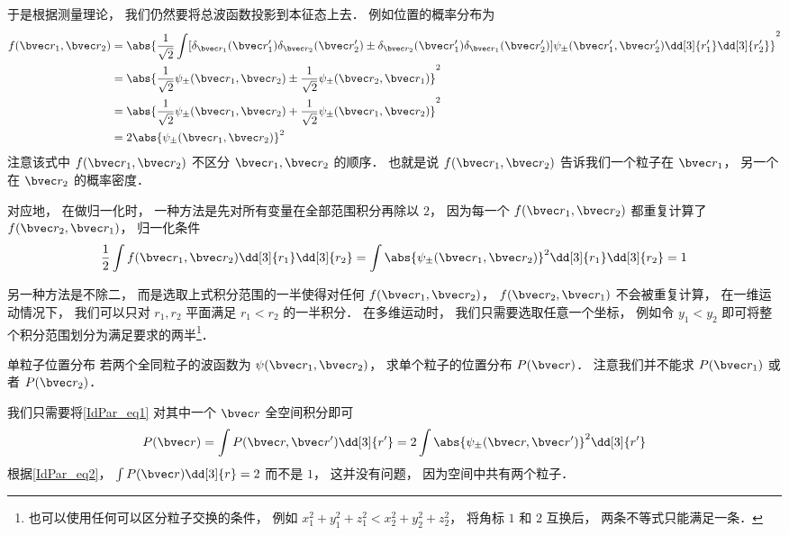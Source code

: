 于是根据测量理论， 我们仍然要将总波函数投影到本征态上去． 例如位置的概率分布为
\begin{equation}\label{IdPar_eq1}
\begin{aligned}
f(\bvec r_1, \bvec r_2) &= \abs{\frac{1}{\sqrt{2}}\int [\delta_{\bvec r_1}(\bvec r'_1) \delta_{\bvec r_2}(\bvec r'_2) \pm \delta_{\bvec r_2}(\bvec r'_1) \delta_{\bvec r_1}(\bvec r'_2)] \psi_\pm(\bvec r'_1,\bvec r'_2) \dd[3]{r'_1}\dd[3]{r'_2}}^2\\
&= \abs{\frac{1}{\sqrt{2}} \psi_\pm(\bvec r_1, \bvec r_2) \pm  \frac{1}{\sqrt{2}} \psi_\pm(\bvec r_2, \bvec r_1)}^2\\
&= \abs{\frac{1}{\sqrt{2}} \psi_\pm(\bvec r_1, \bvec r_2) +  \frac{1}{\sqrt{2}} \psi_\pm(\bvec r_1, \bvec r_2)}^2\\
&= 2\abs{\psi_\pm(\bvec r_1, \bvec r_2)}^2
\end{aligned}
\end{equation}
注意该式中 $f(\bvec r_1, \bvec r_2)$ 不区分 $\bvec r_1, \bvec r_2$ 的顺序． 也就是说 $f(\bvec r_1, \bvec r_2)$ 告诉我们一个粒子在 $\bvec r_1$， 另一个在 $\bvec r_2$ 的概率密度．

对应地， 在做归一化时， 一种方法是先对所有变量在全部范围积分再除以 $2$， 因为每一个 $f(\bvec r_1, \bvec r_2)$ 都重复计算了 $f(\bvec r_2, \bvec r_1)$， 归一化条件
\begin{equation}\label{IdPar_eq2}
\frac{1}{2}\int f(\bvec r_1, \bvec r_2) \dd[3]{r_1}\dd[3]{r_2} = \int \abs{\psi_\pm(\bvec r_1, \bvec r_2)}^2 \dd[3]{r_1}\dd[3]{r_2} = 1
\end{equation}

另一种方法是不除二， 而是选取上式积分范围的一半使得对任何 $f(\bvec r_1, \bvec r_2)$， $f(\bvec r_2, \bvec r_1)$ 不会被重复计算， 在一维运动情况下， 我们可以只对 $r_1, r_2$ 平面满足 $r_1 < r_2$ 的一半积分． 在多维运动时， 我们只需要选取任意一个坐标， 例如令 $y_1 < y_2$ 即可将整个积分范围划分为满足要求的两半\footnote{也可以使用任何可以区分粒子交换的条件， 例如 $x_1^2 + y_1^2 + z_1^2 < x_2^2 + y_2^2 + z_2^2$， 将角标 $1$ 和 $2$ 互换后， 两条不等式只能满足一条．}．

\begin{example}{单粒子位置分布}\label{IdPar_ex1}
若两个全同粒子的波函数为 $\psi(\bvec r_1,\bvec r_2)$， 求单个粒子的位置分布 $P(\bvec r)$． 注意我们并不能求 $P(\bvec r_1)$ 或者 $P(\bvec r_2)$．

我们只需要将\autoref{IdPar_eq1} 对其中一个 $\bvec r$ 全空间积分即可
\begin{equation}
P(\bvec r) = \int P(\bvec r, \bvec r') \dd[3]{r'} = 2\int \abs{\psi_\pm(\bvec r, \bvec r')}^2 \dd[3]{r'} 
\end{equation}
根据\autoref{IdPar_eq2}， $\int P(\bvec r) \dd[3]{r} = 2$ 而不是 $1$， 这并没有问题， 因为空间中共有两个粒子．
\end{example}

